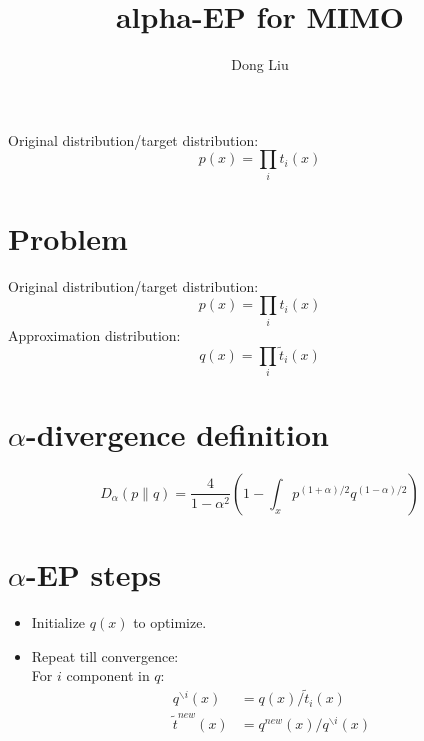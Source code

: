 \documentclass{article}
\author{Dong Liu}
\title{alpha-EP for MIMO}
\begin{document}
Original distribution/target distribution:
\begin{equation}
  p(x) = \prod_i t_i(x)
\end{equation}

\maketitle
\tableofcontents


\section{Problem}
\label{sec-1}
Original distribution/target distribution:
\begin{equation}
  p(x) = \prod_i t_i(x)
\end{equation}
Approximation distribution:
\begin{equation}
  q(x) = \prod_i \tilde{t}_i(x)
\end{equation}

\section{$\alpha$-divergence definition}
\label{sec-2}
\begin{equation}
  D_{\alpha}(p\|q) = \frac{4}{1-\alpha^2} \left( 1 - \int_x p^{(1+\alpha)/2} q^{(1-\alpha)/2} \right)
\end{equation}

\section{$\alpha$-EP steps}
\begin{itemize}
  \item[] Initialize $q(x)$ to optimize.
  \item[] Repeat till convergence:\\
    For $i$ component in $q$:
    \begin{align}
      q^{\backslash i}(x) &= q(x) / \tilde{t}_i(x)\\
      \tilde{t}^{new}(x) &= q^{new}(x)/q^{\backslash i}(x)
    \end{align}
\end{itemize}    
  
\end{document}
